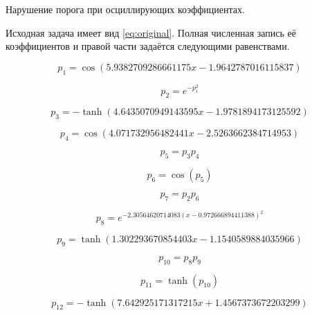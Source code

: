 Нарушение порога при осциллирующих коэффициентах.

Исходная задача имеет вид \eqref{eq:original}. Полная численная запись её коэффициентов и правой части задаётся следующими равенствами.

\begin{equation}
p_{1}=\cos{\left(5.9382709286661175 x - 1.9642787016115837 \right)}
\end{equation}


\begin{equation}
p_{2}=e^{- p_{1}^{2}}
\end{equation}


\begin{equation}
p_{3}=- \tanh{\left(4.6435070949143595 x - 1.9781894173125592 \right)}
\end{equation}


\begin{equation}
p_{4}=\cos{\left(4.071732956482441 x - 2.5263662384714953 \right)}
\end{equation}


\begin{equation}
p_{5}=p_{3} p_{4}
\end{equation}


\begin{equation}
p_{6}=\cos{\left(p_{5} \right)}
\end{equation}


\begin{equation}
p_{7}=p_{2} p_{6}
\end{equation}


\begin{equation}
p_{8}=e^{- 2.30564620714083 \left(x - 0.972666894411388\right)^{2}}
\end{equation}


\begin{equation}
p_{9}=\tanh{\left(1.302293670854403 x - 1.1540589884035966 \right)}
\end{equation}


\begin{equation}
p_{10}=p_{8} p_{9}
\end{equation}


\begin{equation}
p_{11}=\tanh{\left(p_{10} \right)}
\end{equation}


\begin{equation}
p_{12}=- \tanh{\left(7.642925171317215 x + 1.4567373672203299 \right)}
\end{equation}


